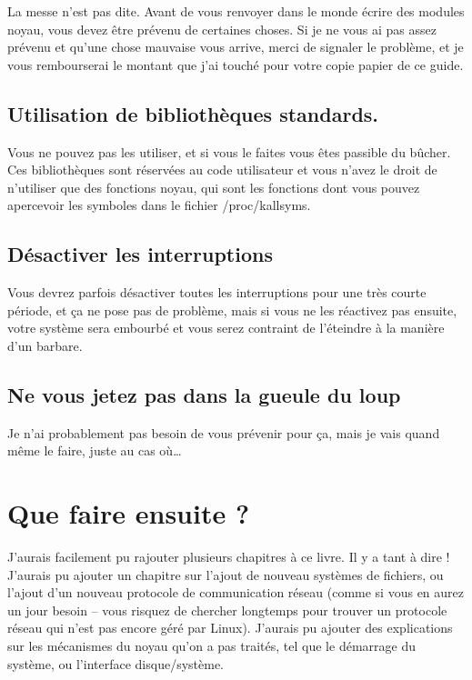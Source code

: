 \documentclass[11pt]{article}
\begin{document}
La messe n'est pas dite. Avant de vous renvoyer dans le monde écrire des modules noyau, vous devez être prévenu de certaines choses. Si je ne vous ai pas assez prévenu et qu'une chose mauvaise vous arrive, merci de signaler le problème, et je vous rembourserai le montant que j'ai touché pour votre copie papier de ce guide.

\subsection*{Utilisation de bibliothèques standards.}
\label{sec-19-1}

Vous ne pouvez pas les utiliser, et si vous le faites vous êtes passible du bûcher. Ces bibliothèques sont réservées au code utilisateur et vous n'avez le droit de n'utiliser que des fonctions noyau, qui sont les fonctions dont vous pouvez apercevoir les symboles dans le fichier /proc/kallsyms.

\subsection*{Désactiver les interruptions}
\label{sec-19-2}
Vous devrez parfois désactiver toutes les interruptions pour une très courte période, et ça ne pose pas de problème, mais si vous ne les réactivez pas ensuite, votre système sera embourbé et vous serez contraint de l'éteindre à la manière d'un barbare.

\subsection*{Ne vous jetez pas dans la gueule du loup}
\label{sec-19-3}

Je n'ai probablement pas besoin de vous prévenir pour ça, mais je vais quand même le faire, juste au cas où\ldots{}

\section*{Que faire ensuite ?}
\label{sec-20}

J'aurais facilement pu rajouter plusieurs chapitres à ce livre. Il y a tant à dire ! J'aurais pu ajouter un chapitre sur l'ajout de nouveau systèmes de fichiers, ou l'ajout d'un nouveau protocole de communication réseau (comme si vous en aurez un jour besoin -- vous risquez de chercher longtemps pour trouver un protocole réseau qui n'est pas encore géré par Linux). J'aurais pu ajouter des explications sur les mécanismes du noyau qu'on a pas traités, tel que le démarrage du système, ou l'interface disque/système.
\end{document}
